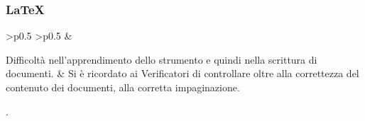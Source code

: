 \subsubsection{\LaTeX}
\renewcommand{\arraystretch}{1.5}
\begin{longtable}{ 
    >{}p{} 
        >{}p{}
}
\rowcolorhead
\centering {} &

\centering {} 
\endfirsthead	
\endhead
Difficoltà nell'apprendimento dello strumento e quindi nella scrittura di documenti. & Si è ricordato ai Verificatori di controllare oltre alla correttezza del contenuto dei documenti, alla corretta impaginazione. \\
\caption{Tabella problemi \LaTeX}
    \end{longtable}.
